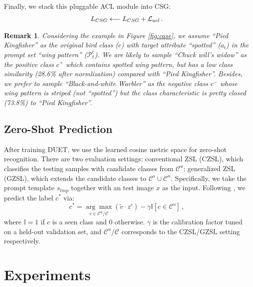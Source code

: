 \documentclass[letterpaper]{article} \usepackage{aaai23}  \usepackage{times}  \usepackage{helvet}  \usepackage{courier}  \usepackage[hyphens]{url}  \usepackage{graphicx} \urlstyle{rm} \def\UrlFont{\rm}  \usepackage{natbib}  \usepackage{caption} \frenchspacing  \setlength{\pdfpagewidth}{8.5in}  \setlength{\pdfpageheight}{11in}  \usepackage{algorithm}
\newtheorem{remark}{\noindent \textbf{Remark}}
\newcommand{\fy}[1]{{\color{black}#1}}
\begin{document}
Finally, we stack this pluggable ACL module into CSG:
\begin{align}
 L_{CSG} \longleftarrow L_{CSG} + \mathcal{L}_{acl}\,.
 \vspace{-2pt}
\end{align}
\begin{remark}
\vspace{-7pt}
{Considering the example in Figure \ref{fig:case},} we assume ``Pied Kingfisher'' as the original bird class ($c$) with  target attribute ``spotted'' ($a_{t}$) in {the} prompt set ``wing pattern'' ($\mathcal{P}_{t}^{c}$).  
We are likely to sample  ``Chuck will's widow'' as the positive class $c^+$ which {contains} spotted wing pattern, but has a low class similarity (28.6\% after normlization) compared with ``Pied Kingfisher''. Besides, we prefer to sample ``Black-and-white Warbler'' as the negative class $c^-$ whose wing pattern is striped ({not} ``spotted'') but the class characteristic is pretty closed (73.8\%) to ``Pied Kingfisher''.
\end{remark}


\subsection{Zero-Shot Prediction}\label{sec:ZSP}
After training DUET, we use the learned cosine metric space for zero-shot recognition.
There are two evaluation settings: \fy{conventional ZSL (CZSL), which classifies the testing samples with candidate classes from $\mathcal{C}^u$;
generalized ZSL (GZSL), which} 
extends the candidate classes to $\mathcal{C}^s \cup \mathcal{C}^u$. 
Specifically, we take the prompt template $s_{tmp}$ 
together with an test image $x$ as the input.
Following \cite{DBLP:conf/cvpr/Liu00H00H21,Chen2022MSDN}, we 
predict the label $c^*$ via:
\begin{equation}
c^{*}=\underset{c \in \mathcal{C}^u / \mathcal{C}}{\arg \max } \left(\tilde{v} \cdot z^c \right) - \gamma \mathbb{I}\left[c \in \mathcal{C}^{s}\right]\,,
\end{equation}
where $\mathbb{I}=1$ if $c$ is a seen class and 0 otherwise. $\gamma$ is the calibration factor tuned on a held-out validation set, and  $\mathcal{C}^u / \mathcal{C}$ corresponds to the CZSL/GZSL setting respectively.




\section{Experiments}
\end{document}
